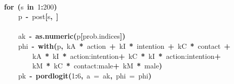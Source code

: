 \documentclass{article}
\makeatletter
\newcommand{\hlnumber}[1]{\textcolor[rgb]{0,0,0}{#1}}%
\newcommand{\hlfunctioncall}[1]{\textcolor[rgb]{.5,0,.33}{\textbf{#1}}}%
\newcommand{\hlkeyword}[1]{\textbf{#1}}%
\newcommand{\hlargument}[1]{\textcolor[rgb]{.69,.25,.02}{#1}}%
\newcommand{\hlassignement}[1]{\textbf{#1}}%
\newcommand{\hlsymbol}[1]{#1}%
\newcommand{\hlstd}[1]{\textcolor[rgb]{0,0,0}{#1}}%
\newenvironment{kframe}{%
 \def\FrameCommand##1{\hskip\@totalleftmargin \hskip-\fboxsep
 \colorbox{shadecolor}{##1}\hskip-\fboxsep
     \hskip-\linewidth \hskip-\@totalleftmargin \hskip\columnwidth}%
 \MakeFramed {\advance\hsize-\width
   \@totalleftmargin\z@ \linewidth\hsize
   \@setminipage}}%
 {\par\unskip\endMakeFramed}
\newenvironment{knitrout}{}{} %
\makeatother
\begin{document}
\begin{knitrout}
{\begin{kframe}
\begin{flushleft}
\hlstd{}\hspace*{\fill}\\
\hlstd{}{\ }{\ }{\ }{\ }{\ }{\ }{\ }{\ }\hlkeyword{for}{\ }\hlkeyword{(}\hlsymbol{s}{\ }\hlkeyword{in}{\ }\hlnumber{1}\hlkeyword{:}\hlnumber{200}\hlkeyword{)}{\ }\hlkeyword{\usebox{\hlnormalsizeboxopenbrace}}\hspace*{\fill}\\
\hlstd{}{\ }{\ }{\ }{\ }{\ }{\ }{\ }{\ }{\ }{\ }{\ }{\ }\hlsymbol{p}{\ }\hlassignement{\usebox{\hlnormalsizeboxlessthan}-}{\ }\hlsymbol{post}\hlkeyword{[}\hlsymbol{s}\hlkeyword{,}{\ }\hlkeyword{]}\hspace*{\fill}\\
\hlstd{}\hspace*{\fill}\\
\hlstd{}{\ }{\ }{\ }{\ }{\ }{\ }{\ }{\ }{\ }{\ }{\ }{\ }\hlsymbol{ak}{\ }\hlassignement{\usebox{\hlnormalsizeboxlessthan}-}{\ }\hlfunctioncall{as.numeric}\hlkeyword{(}\hlsymbol{p}\hlkeyword{[}\hlsymbol{prob.indices}\hlkeyword{]}\hlkeyword{)}\hspace*{\fill}\\
\hlstd{}{\ }{\ }{\ }{\ }{\ }{\ }{\ }{\ }{\ }{\ }{\ }{\ }\hlsymbol{phi}{\ }\hlassignement{\usebox{\hlnormalsizeboxlessthan}-}{\ }\hlfunctioncall{with}\hlkeyword{(}\hlsymbol{p}\hlkeyword{,}{\ }\hlsymbol{kA}{\ }\hlkeyword{*}{\ }\hlsymbol{action}{\ }\hlkeyword{+}{\ }\hlsymbol{kI}{\ }\hlkeyword{*}{\ }\hlsymbol{intention}{\ }\hlkeyword{+}{\ }\hlsymbol{kC}{\ }\hlkeyword{*}{\ }\hlsymbol{contact}{\ }\hlkeyword{+}\hspace*{\fill}\\
\hlstd{}{\ }{\ }{\ }{\ }{\ }{\ }{\ }{\ }{\ }{\ }{\ }{\ }{\ }{\ }{\ }{\ }\hlsymbol{kA}{\ }\hlkeyword{*}{\ }\hlsymbol{kI}{\ }\hlkeyword{*}{\ }\hlsymbol{\usebox{\hlnormalsizeboxbacktick}action:intention\usebox{\hlnormalsizeboxbacktick}}{\ }\hlkeyword{+}{\ }\hlsymbol{kC}{\ }\hlkeyword{*}{\ }\hlsymbol{kI}{\ }\hlkeyword{*}{\ }\hlsymbol{\usebox{\hlnormalsizeboxbacktick}action:intention\usebox{\hlnormalsizeboxbacktick}}{\ }\hlkeyword{+}\hspace*{\fill}\\
\hlstd{}{\ }{\ }{\ }{\ }{\ }{\ }{\ }{\ }{\ }{\ }{\ }{\ }{\ }{\ }{\ }{\ }\hlsymbol{kM}{\ }\hlkeyword{*}{\ }\hlsymbol{kC}{\ }\hlkeyword{*}{\ }\hlsymbol{\usebox{\hlnormalsizeboxbacktick}contact:male\usebox{\hlnormalsizeboxbacktick}}{\ }\hlkeyword{+}{\ }\hlsymbol{kM}{\ }\hlkeyword{*}{\ }\hlsymbol{male}\hlkeyword{)}\hspace*{\fill}\\
\hlstd{}{\ }{\ }{\ }{\ }{\ }{\ }{\ }{\ }{\ }{\ }{\ }{\ }\hlsymbol{pk}{\ }\hlassignement{\usebox{\hlnormalsizeboxlessthan}-}{\ }\hlfunctioncall{pordlogit}\hlkeyword{(}\hlnumber{1}\hlkeyword{:}\hlnumber{6}\hlkeyword{,}{\ }\hlargument{a}{\ }\hlargument{=}{\ }\hlsymbol{ak}\hlkeyword{,}{\ }\hlargument{phi}{\ }\hlargument{=}{\ }\hlsymbol{phi}\hlkeyword{)}\hspace*{\fill}\\

\end{flushleft}
\end{kframe}}
\end{knitrout}
\end{document}
